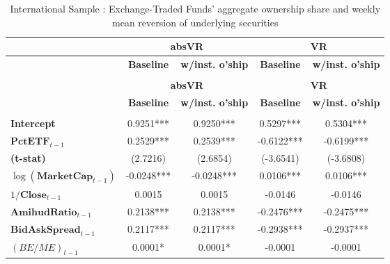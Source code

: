 {\scriptsize\tabcolsep=3pt
\begin{longtable}{>{\bfseries}lcccc}
\toprule
& \multicolumn{2}{c}{\textbf{absVR}} &  \multicolumn{2}{c}{\textbf{VR}}\\
\midrule
&   \textbf{Baseline}   & \textbf{w/inst. o'ship} &   \textbf{Baseline}  & \textbf{w/inst. o'ship}  \\
\midrule
\endhead
\caption{International Sample : Exchange-Traded Funds' aggregate ownership share and weekly mean reversion of underlying securities}
\label{tab:short:Efficiency:Intl:Comp}\\
\toprule
 & \multicolumn{2}{c}{\textbf{absVR}} &  \multicolumn{2}{c}{\textbf{VR}}\\
\midrule
 &   \textbf{Baseline}   & \textbf{w/inst. o'ship} &   \textbf{Baseline}  & \textbf{w/inst. o'ship} \\
\midrule
\endfirsthead
\bottomrule
\multicolumn{5}{r}{\textit{Continues on next page}}\\
\endfoot
\bottomrule
\endlastfoot
Intercept                         &       0.9251***       &              0.9250***             &       0.5297***       &           0.5304***            \\
\rowcolor{blue!20}
$\mathbf{PctETF}_{t-1}$           &       0.2529***       &              0.2539***             &      -0.6122***       &          -0.6199***            \\
(t-stat)                                 &      (2.7216)      &             (2.6854)            &     (-3.6541)      &         (-3.6808)           \\
$\log(\mathbf{MarketCap}_{t-1})$   &      -0.0248***       &             -0.0248***             &       0.0106***       &           0.0106***            \\
$1/\mathbf{Close}_{t-1}$            &       0.0015       &              0.0015             &      -0.0146       &          -0.0146            \\
$\mathbf{AmihudRatio}_{t-1}$               &       0.2138***       &              0.2138***             &      -0.2476***       &          -0.2475***            \\
$\mathbf{BidAskSpread}_{t-1}$        &       0.2117***       &              0.2117***             &      -0.2938***       &          -0.2937***            \\
$\left(BE/ME\right)_{t-1}$          &       0.0001*       &              0.0001*             &      -0.0001       &          -0.0001            \\

\end{longtable}}
